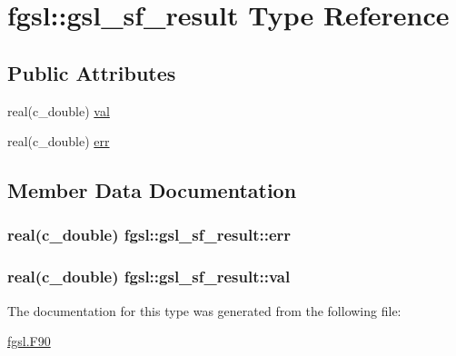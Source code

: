 \hypertarget{structfgsl_1_1gsl__sf__result}{\section{fgsl\-:\-:gsl\-\_\-sf\-\_\-result Type Reference}
\label{structfgsl_1_1gsl__sf__result}
}
\subsection*{Public Attributes}
\begin{DoxyCompactItemize}
\item 
real(c\-\_\-double) \hyperlink{structfgsl_1_1gsl__sf__result_a3cf49c46128f015cdb174291cf9b10fb}{val}
\item 
real(c\-\_\-double) \hyperlink{structfgsl_1_1gsl__sf__result_ae5dd18e3633341000bf91b4fc186ac24}{err}
\end{DoxyCompactItemize}


\subsection{Member Data Documentation}
\hypertarget{structfgsl_1_1gsl__sf__result_ae5dd18e3633341000bf91b4fc186ac24}{
\subsubsection[{err}]{\setlength{\rightskip}{0pt plus 5cm}real(c\-\_\-double) fgsl\-::gsl\-\_\-sf\-\_\-result\-::err}}\label{structfgsl_1_1gsl__sf__result_ae5dd18e3633341000bf91b4fc186ac24}
\hypertarget{structfgsl_1_1gsl__sf__result_a3cf49c46128f015cdb174291cf9b10fb}{
\subsubsection[{val}]{\setlength{\rightskip}{0pt plus 5cm}real(c\-\_\-double) fgsl\-::gsl\-\_\-sf\-\_\-result\-::val}}\label{structfgsl_1_1gsl__sf__result_a3cf49c46128f015cdb174291cf9b10fb}


The documentation for this type was generated from the following file\-:\begin{DoxyCompactItemize}
\item 
\hyperlink{fgsl_8F90}{fgsl.\-F90}\end{DoxyCompactItemize}
